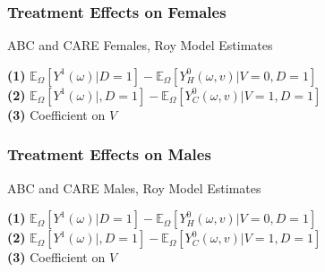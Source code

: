 \documentclass[static]{JJH-Beamer}
\begin{document}

\begin{frame} \label{royfemales}

\frametitle{Treatment Effects on Females}
\begin{table}
	\caption{ABC and CARE Females, Roy Model Estimates}
	\scalebox{0.75}{}
\end{table}
\begin{tiny}
\textbf{(1)} $\mathbb{E}_{\Omega} \left[ Y^1 \left( \omega \right) | D = 1 \right] - \mathbb{E}_{\Omega} \left[ Y^0_H \left( \omega, v \right) | V = 0 , D = 1  \right]$\\ 
\textbf{(2)} $\mathbb{E}_{\Omega} \left[ Y^1 \left( \omega \right) | , D = 1 \right] - \mathbb{E}_{\Omega} \left[ Y^0_C \left( \omega, v \right) | V = 1 , D = 1  \right]$\\
\textbf{(3)}  Coefficient on $V$
\end{tiny}

\begin{flushleft}
\hyperlink{resultsfemales}{}
\end{flushleft}
\end{frame}


\begin{frame} \label{roymales}

\frametitle{Treatment Effects on Males}
\begin{table}
	\caption{ABC and CARE Males, Roy Model Estimates}
	\scalebox{0.65}{}
\end{table}
\begin{tiny}
\textbf{(1)} $\mathbb{E}_{\Omega} \left[ Y^1 \left( \omega \right) | D = 1 \right] - \mathbb{E}_{\Omega} \left[ Y^0_H \left( \omega, v \right) | V = 0 , D = 1  \right]$\\ 
\textbf{(2)} $\mathbb{E}_{\Omega} \left[ Y^1 \left( \omega \right) | , D = 1 \right] - \mathbb{E}_{\Omega} \left[ Y^0_C \left( \omega, v \right) | V = 1 , D = 1  \right]$\\
\textbf{(3)}  Coefficient on $V$
\end{tiny}

\begin{flushleft}
\hyperlink{resultsmales}{}
\end{flushleft}
\end{frame}
\end{document}
